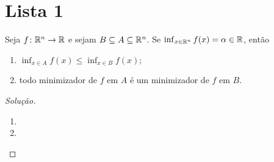 \documentclass[12pt,twoside,a4paper]{book}
\begin{document}
\chapter*{Lista 1}
\begin{problema}
Seja \(f\colon\mathbb{R}^n\to\mathbb{R}\) e sejam \(B\subseteq A\subseteq\mathbb{R}^n\). Se
\(\inf_{x\in\mathbb{R}^n}f(x)=\alpha\in\mathbb{R}\), então
\begin{enumerate}[label=(\roman*)]
\item \(\inf_{x\in A}f(x)\leq\inf_{x\in B}f(x)\);
\item todo minimizador de \(f\) em \(A\) é um minimizador de \(f\) em \(B\).
\end{enumerate}
\end{problema}
\begin{proof}[Solução]\hfill
  \begin{enumerate}[label=(\roman*)]
  \item
  \item
    \end{enumerate}
\end{proof}
\end{document}
